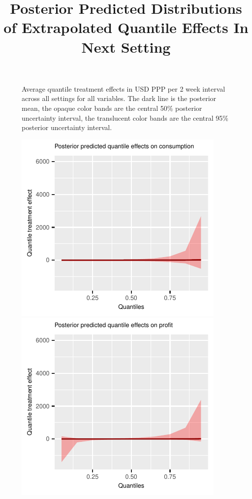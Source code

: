 \documentclass[english,12pt]{article}\usepackage{lmodern}
\numberwithin{equation}{section}
\begin{document}
\begin{figure}[h!]
  \caption{ Average quantile treatment effects in USD PPP per 2 week interval across all settings for all variables. The dark line is the posterior mean, the opaque color bands are the central 50\% posterior uncertainty interval, the translucent color bands are the central 95\% posterior uncertainty interval. }\label{posterior general quantiles}
\end{figure}




 \begin{figure}[h!]
  \centering
   \title{Posterior Predicted Distributions of Extrapolated Quantile Effects In Next Setting}
    \includegraphics[scale=0.4]{posterior_predicted_quantile_TEs_consumption_lognormal.pdf}
        \includegraphics[scale=0.4]{posterior_predicted_quantile_TEs_profit_lognormal.pdf}\\

\end{figure}
\end{document}
